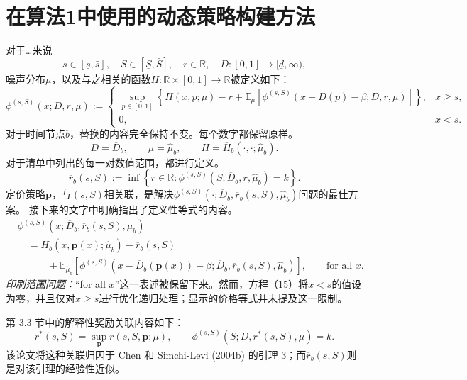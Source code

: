 \documentclass[11pt]{article}
\begin{document}
\section*{在算法1中使用的动态策略构建方法}
对于…来说
\[
s\in[\underline s,\bar s],\quad
S\in[\underline S,\bar S],\quad r\in\mathbb R,
\quad D:[0,1]\longrightarrow[\underline d,\infty),
\]
噪声分布\(\mu\)，以及与之相关的函数\(H:\mathbb R\times[0,1]\longrightarrow\mathbb R\)被定义如下：
\begin{equation}
\phi^{(s,S)}(x;D,r,\mu):=
\begin{cases}
\displaystyle\sup_{p\in[0,1]}
\left\{H(x,p;\mu)-r+
\mathbb E_\mu\!\left[
\phi^{(s,S)}(x-D(p)-\beta;D,r,\mu)
\right]\right\},&x\geq s,\\
0,&x<s.
\end{cases}
\tag{15}
\end{equation}
对于时间节点\(b\)，替换的内容完全保持不变。每个数字都保留原样。
\[
D=\overline D_b,\qquad
\mu=\widehat\mu_b,\qquad
H=\overline H_b(\cdot,\cdot;\widehat\mu_b).
\]
对于清单中列出的每一对数值范围，都进行定义。
\begin{equation}
\overline r_b(s,S):=
\inf\left\{r\in\mathbb R:
\phi^{(s,S)}(S;\overline D_b,r,\widehat\mu_b)=k\right\}.
\tag{16}
\end{equation}
定价策略\(\boldsymbol p\)，与\((s,S)\)相关联，是解决\(\phi^{(s,S)}(\cdot;\overline D_b,\overline r_b(s,S),\widehat\mu_b)\)问题的最佳方案。  
接下来的文字中明确指出了定义性等式的内容。
\[
\begin{aligned}
&\phi^{(s,S)}(x;\overline D_b,\overline r_b(s,S),\widehat\mu_b)\\
&\quad=\overline H_b(x,\boldsymbol p(x);\widehat\mu_b)
-\overline r_b(s,S)\\
&\qquad\quad+
\mathbb E_{\widehat\mu_b}\!\left[
\phi^{(s,S)}\!\left(x-\overline D_b(\boldsymbol p(x))-\beta;
\overline D_b,\overline r_b(s,S),\widehat\mu_b\right)
\right],\qquad\text{for all }x.
\end{aligned}
\]
\emph{印刷范围问题：}“for all \(x\)”这一表述被保留下来。然而，方程（15）将\(x<s\)的值设为零，并且仅对\(x\geq s\)进行优化递归处理；显示的价格等式并未提及这一限制。

第 3.3 节中的解释性奖励关联内容如下：
\[
r^*(s,S)=\sup_{\boldsymbol p}r(s,S,\boldsymbol p;\mu),
\qquad
\phi^{(s,S)}(S;D,r^*(s,S),\mu)=k.
\]
该论文将这种关联归因于 Chen 和 Simchi-Levi (2004b) 的引理 3；而\(\overline r_b(s,S)\)则是对该引理的经验性近似。
\end{document}
